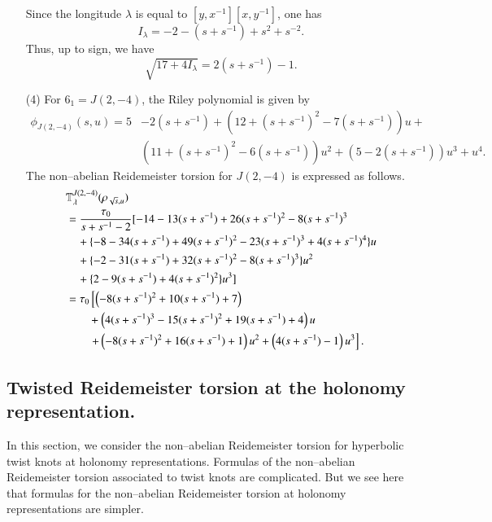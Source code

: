\documentclass[a4paper]{amsart}
\theoremstyle{plain}
\theoremstyle{definition}
\theoremstyle{remark}
\begin{document}
\begin{itemize}
    Since the longitude $\lambda$ is equal to $[y,x^{-1}][x, y^{-1}]$, one has  
    $$I_{\lambda} = -2 - (s+s^{-1}) + s^2+s^{-2}.$$
 Thus, up to sign, we have 
$$\sqrt{17 + 4I_{\lambda}}= 2(s+s^{-1})-1.$$
\item[(4)]
    For $6_1 = J(2, -4)$, the Riley polynomial is given by 
\[
\begin{split}
\phi_{J(2, -4)}(s, u)= 5 &- 2(s+s^{-1})+\left(12+(s+s^{-1})^2 -7(s+s^{-1})\right)u + \\ & \left(11+(s+s^{-1})^2-6(s+s^{-1})\right)u^2+\left(5-2(s+s^{-1})\right)u^3+u^4.
\end{split}
\]
    The non--abelian Reidemeister torsion for $J(2, -4)$ is expressed as follows.
    \begin{align*}
    \lefteqn{
        {\mathbb T}^{J(2, -4)}_{\lambda}(\rho_{\sqrt{s}, u})} &\\
            &= \frac{\tau_0}{s + s^{-1} -2}  
                   [-14 - 13(s+s^{-1}) +26(s+s^{-1})^2 -8(s+s^{-1})^3\\
            &\quad
                    +\{-8 - 34(s+s^{-1}) +49(s+s^{-1})^2 - 23(s+s^{-1})^3 + 4(s+s^{-1})^4\}u \\
            &\quad
                    +\{-2 - 31(s+s^{-1}) + 32(s+s^{-1})^2 - 8(s+s^{-1})^3\}u^2 \\
            &\quad 
                    +\{2 -9(s+s^{-1}) +4(s+s^{-1})^2\}u^3 ]\\
            &=\tau_0\left[ \left(-8(s+s^{-1})^2+10(s+s^{-1})+7\right) \right.\\
            &\qquad +\left(4(s+s^{-1})^3-15(s+s^{-1})^2+19(s+s^{-1})+4\right)u\\
            &\qquad \left.+\left(-8(s+s^{-1})^2+16(s+s^{-1})+1\right)u^2
                   +\left(4(s+s^{-1})-1\right)u^3 \right].
    \end{align*}
\end{itemize}
\subsection{Twisted Reidemeister torsion at the holonomy representation.}
\label{subsection:results_holonomy}
In this section, we consider the non--abelian Reidemeister torsion for hyperbolic twist knots at holonomy representations.
Formulas of the non--abelian Reidemeister torsion associated to twist knots are complicated.
But we see here that formulas for the non--abelian Reidemeister torsion at holonomy representations are simpler.
\end{document}
